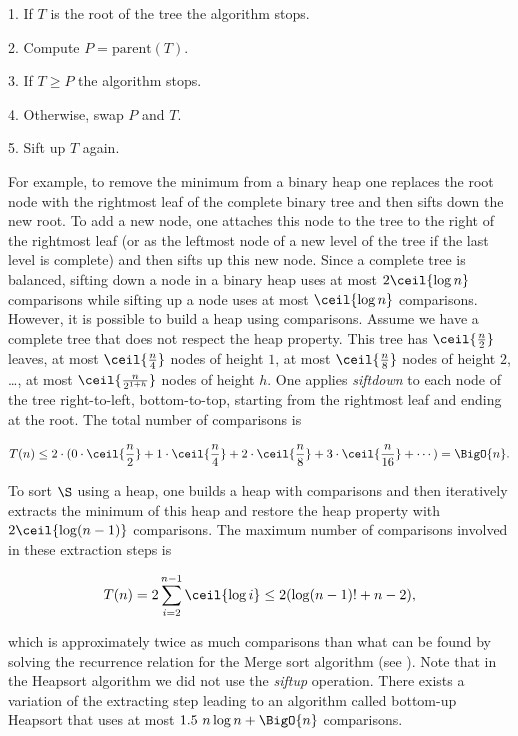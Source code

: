 \begin{algorithm}
\item[1.] If \(T\) is the root of the tree the algorithm stops.
\item[2.] Compute \(P = \text{parent}(T)\).
\item[3.] If \(T \ge P\) the algorithm stops.
\item[4.] Otherwise, swap \(P\) and \(T\).
\item[5.] Sift up \(T\) again.
\end{algorithm}

For example, to remove the minimum from a binary heap one replaces the root
node with the rightmost leaf of the complete binary tree and then sifts down
the new root. To add a new node, one attaches this node to the tree to the
right of the rightmost leaf (or as the leftmost node of a new level
of the tree if the last level is complete) and then sifts up this new node.
Since a complete tree is balanced, sifting down a node in a binary heap uses
at most \(2 \ceil{\log n}\) comparisons while sifting up a node uses at most
\(\ceil{\log n}\)
comparisons. However, it is possible to build a heap using 
comparisons. Assume we have a complete tree that does not respect the heap
property. This tree has \(\ceil{\frac{n}{2}}\) leaves, at most
\(\ceil{\frac{n}{4}}\) nodes of height \(1\), at most \(\ceil{\frac{n}{8}}\)
nodes of height \(2\), \dots, \ie at most \(\ceil{\frac{n}{2^{1+h}}}\) nodes
of height \(h\).
One applies \emph{siftdown} to each node of the tree right-to-left,
bottom-to-top, starting from the rightmost leaf and ending at the root. The
total number of comparisons is

\begin{displaymath}
T(n) \le 2 \cdot ( 0 \cdot \ceil{\frac{n}{2}} + 1 \cdot \ceil{\frac{n}{4}} + 2 \cdot
\ceil{\frac{n}{8}} + 3 \cdot \ceil{\frac{n}{16}} + \cdots ) = \BigO{n}.
\end{displaymath}

To sort \(\S\) using a heap, one builds a heap with  comparisons and
then iteratively extracts the minimum of this heap and restore the heap
property with \(2\ceil{\log (n-1)}\)
comparisons. The maximum number of comparisons involved in these extraction
steps is

\begin{displaymath}
T(n) = 2 \sum_{i=2}^{n-1} \ceil{\log i} \le 2 ( \log (n-1)! + n - 2 ),
\end{displaymath}

which is approximately twice as much comparisons than what can be found by
solving the recurrence relation for the Merge sort algorithm (see
\citet*{OEIS:A001855}). Note that in the Heapsort algorithm we did not use the
\emph{siftup} operation. There exists \cite{wegener:1993} a variation of the
extracting step leading to an algorithm called bottom-up Heapsort that uses at
most \(1.5~n \log n + \BigO{n}\) comparisons.

